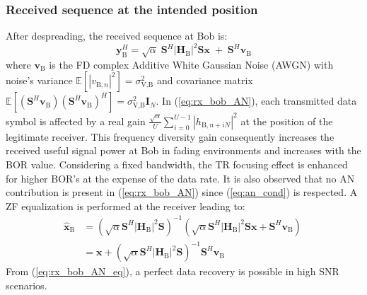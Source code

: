 \documentclass[journal,comsoc]{IEEEtran}
\newcommand{\module}[1]{\left|#1\right|}
\newcommand{\EX}[1]{\mathbb{E} \left[#1\right]}%
\newcommand{\HB}{\textbf{H}_{\text{B}}}
\newcommand{\spread}{\textbf{S}}
\begin{document}
\subsubsection{Received sequence at the intended position}
After despreading, the received sequence at Bob is: 
\begin{equation}
	\textbf{y}_{\text{B}}^H = \sqrt{\alpha} \; \spread^H \module{\HB}^2 \spread \textbf{x} \;  +  \;  \spread^H \textbf{v}_\text{B} 
	\label{eq:rx_bob_AN}
\end{equation}
where $\textbf{v}_\text{B}$ is the FD complex Additive White Gaussian Noise (AWGN) with noise's variance $\EX{|v_{\text{B},n}|^2}  = \sigma_{\text{V,B}}^2$ and covariance matrix $\EX{(\spread^H  \textbf{v}_\text{B}) (\spread^H \textbf{v}_\text{B})^H} = \sigma_{\text{V,B}}^2 \textbf{I}_N$. In (\ref{eq:rx_bob_AN}), each transmitted data symbol is affected by a real gain $ \frac{\sqrt{\alpha}}{U}\sum_{i=0}^{U-1} \left| h_{\text{B}, n + iN}\right|^2$ at the position of the legitimate receiver. This frequency diversity gain consequently increases the received useful signal power at Bob in fading environments and increases with the BOR value. Considering a fixed bandwidth, the TR focusing effect is enhanced for higher BOR's at the expense of the data rate. It is also observed that no AN contribution is present in (\ref{eq:rx_bob_AN}) since (\ref{eq:an_cond}) is respected. A ZF equalization is performed at the receiver leading to:
\begin{equation}
	\begin{split}
		\hat{\textbf{x}}_{\text{B}} &= \left( \sqrt{\alpha} \spread^H \module{\HB}^2 \spread \right)^{-1}  \left(\sqrt{\alpha}  \spread^H\module{\HB}^2 \spread \textbf{x}   +    \spread^H \textbf{v}_\text{B}\right) \\
		&= \textbf{x} + \left( \sqrt{\alpha} \spread^H \module{\HB}^2 \spread \right)^{-1} \spread^H \textbf{v}_\text{B}
	\end{split}
	\
	\label{eq:rx_bob_AN_eq}
\end{equation}
From (\ref{eq:rx_bob_AN_eq}), a perfect data recovery is possible in high SNR scenarios.



%
\end{document}
